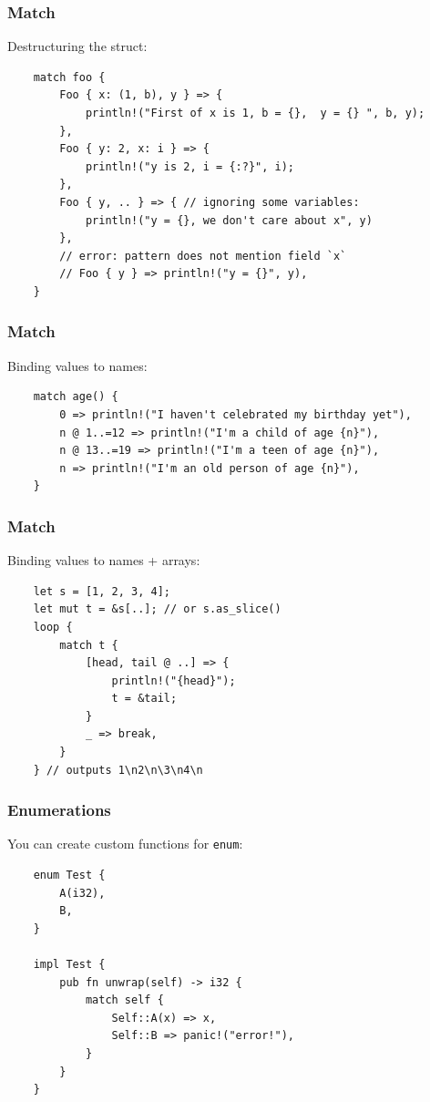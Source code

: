\documentclass[aspectratio=1610,t]{beamer}
\begin{document}

\begin{frame}[fragile]
\frametitle{Match}
Destructuring the struct:

\begin{verbatim}
    match foo {
        Foo { x: (1, b), y } => {
            println!("First of x is 1, b = {},  y = {} ", b, y);
        },
        Foo { y: 2, x: i } => {
            println!("y is 2, i = {:?}", i);
        },
        Foo { y, .. } => { // ignoring some variables:
            println!("y = {}, we don't care about x", y)
        },
        // error: pattern does not mention field `x`
        // Foo { y } => println!("y = {}", y),
    }
\end{verbatim}
\end{frame}


\begin{frame}[fragile]
\frametitle{Match}
Binding values to names:

\begin{verbatim}
    match age() {
        0 => println!("I haven't celebrated my birthday yet"),
        n @ 1..=12 => println!("I'm a child of age {n}"),
        n @ 13..=19 => println!("I'm a teen of age {n}"),
        n => println!("I'm an old person of age {n}"),
    }
\end{verbatim}
\end{frame}


\begin{frame}[fragile]
\frametitle{Match}
Binding values to names + arrays:

\begin{verbatim}
    let s = [1, 2, 3, 4];
    let mut t = &s[..]; // or s.as_slice()
    loop {
        match t {
            [head, tail @ ..] => {
                println!("{head}");
                t = &tail;
            }
            _ => break,
        }  
    } // outputs 1\n2\n\3\n4\n
\end{verbatim}
\end{frame}


\begin{frame}[fragile]
\frametitle{Enumerations}
You can create custom functions for \texttt{enum}:

\begin{verbatim}
    enum Test {
        A(i32),
        B,
    }

    impl Test {
        pub fn unwrap(self) -> i32 {
            match self {
                Self::A(x) => x,
                Self::B => panic!("error!"),
            }
        }
    }
\end{verbatim}
\end{frame}
\end{document}
